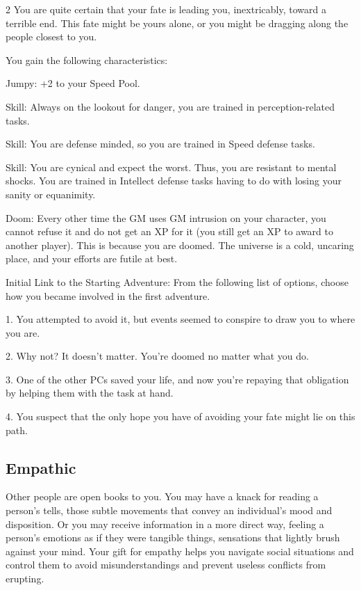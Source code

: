 \begin{multicols}{2}
You are quite certain that your fate is leading you, inextricably, toward a terrible end. This fate might be yours alone, or you might be dragging along the people closest to you.

You gain the following characteristics:

Jumpy: +2 to your Speed Pool.

Skill: Always on the lookout for danger, you are trained in perception-related tasks.

Skill: You are defense minded, so you are trained in Speed defense tasks.

Skill: You are cynical and expect the worst. Thus, you are resistant to mental shocks. You are trained in Intellect defense tasks having to do with losing your sanity or equanimity.

Doom: Every other time the GM uses GM intrusion on your character, you cannot refuse it and do not get an XP for it (you still get an XP to award to another player). This is because you are doomed. The universe is a cold, uncaring place, and your efforts are futile at best.

Initial Link to the Starting Adventure: From the following list of options, choose how you became involved in the first adventure.

1. You attempted to avoid it, but events seemed to conspire to draw you to where you are.

2. Why not? It doesn’t matter. You’re doomed no matter what you do.

3. One of the other PCs saved your life, and now you’re repaying that obligation by helping them with the task at hand.

4. You suspect that the only hope you have of avoiding your fate might lie on this path.

\subsection{Empathic}

Other people are open books to you. You may have a knack for reading a person’s tells, those subtle movements that convey an individual’s mood and disposition. Or you may receive information in a more direct way, feeling a person’s emotions as if they were tangible things, sensations that lightly brush against your mind. Your gift for empathy helps you navigate social situations and control them to avoid misunderstandings and prevent useless conflicts from erupting.


\end{multicols}
